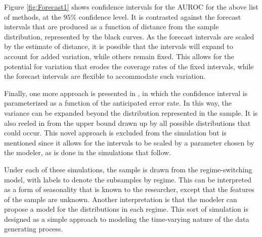 

Figure \ref{fig:Forecast1} shows confidence intervals for the AUROC for the above list of methods, at the $95\%$ confidence level. 
It is contrasted against the forecast intervals that are produced as a function of distance from the sample distribution, represented by the black curves.
%
As the forecast intervals are scaled by the estimate of distance, it is possible that the intervals will expand to account for added variation, while others remain fixed.
%
This allows for the potential for variation that erodes the coverage rates of the fixed intervals, while the forecast intervals are flexible to accommodate such variation. 
%





Finally, one more approach is presented in \citet{cortezMohri2004}, in which the confidence interval is parameterized as a function of the anticipated error rate.
In this way, the variance can be expanded beyond the distribution represented in the sample.
It is also reeled in from the upper bound drawn up by all possible distributions that could occur.
This novel approach is excluded from the simulation but is mentioned since it allows for the intervals to be scaled by a parameter chosen by the modeler, as is done in the simulations that follow.







Under each of these simulations, the sample is drawn from the regime-switching model, with labels to denote the subsamples by regime.
%
This can be interpreted as a form of seasonality that is known to the researcher, except that the features of the sample are unknown.
%
Another interpretation is that the modeler can propose a model for the distributions in each regime.
%
This sort of simulation is designed as a simple approach to modeling the time-varying nature of the data generating process.
%


